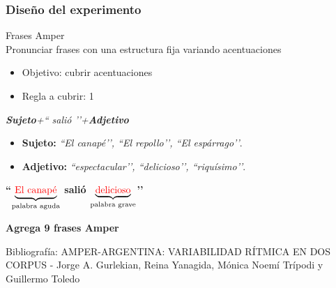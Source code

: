 \documentclass[mathserif]{beamer}%
\begin{document}
\begin{frame}
\frametitle{Diseño del experimento}
	{\Large Frases Amper} \\
	Pronunciar frases con una estructura fija variando acentuaciones
	
	\begin{itemize}
		\item Objetivo: cubrir acentuaciones
		\item Regla a cubrir: 1
	\end{itemize}
	
{\footnotesize 	
	\begin{center}
		\textit{\textbf{Sujeto}+`` salió ’’+\textbf{Adjetivo}} 
		
		\begin{itemize}
			\item \textbf{Sujeto:} \textit{``El canapé’’, ``El repollo’’, ``El espárrago’’}.
			\item \textbf{Adjetivo:} \textit{``espectacular’’, ``delicioso’’, ``riquísimo’’}.
		\end{itemize}
				
		\begin{center}
			\textbf{``$\underbrace{\text{\textcolor{red}{El canapé}}}_{\text{palabra aguda}}$ salió $\underbrace{\text{\textcolor{red}{delicioso}}}_{\text{palabra grave}}$’’}
		\end{center}
		
		\textbf{Agrega 9 frases Amper}	
	\end{center}
}

{\tiny Bibliografía: AMPER-ARGENTINA: VARIABILIDAD RÍTMICA EN DOS CORPUS - Jorge A. Gurlekian, Reina Yanagida, Mónica Noemí Trípodi y Guillermo Toledo}
\end{frame} 
\end{document}
